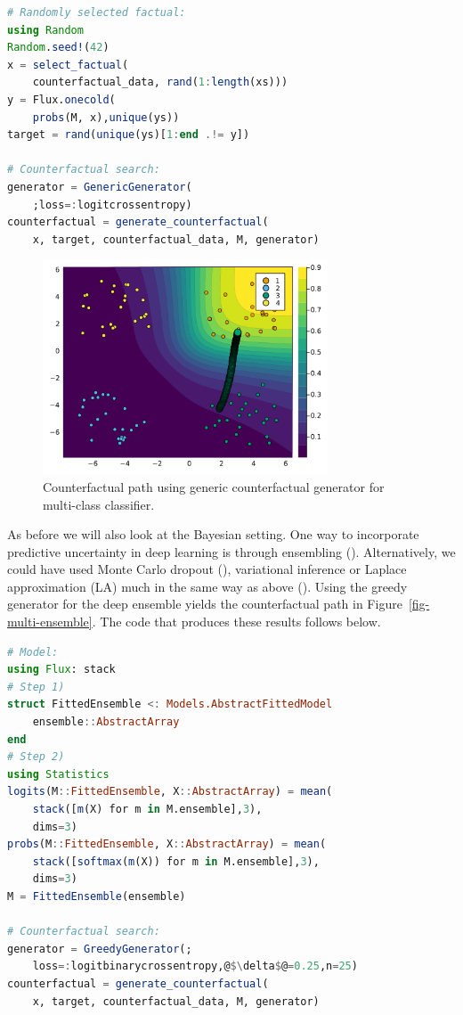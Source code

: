 \documentclass{juliacon}
\begin{document}
\begin{lstlisting}[language=Julia, escapechar=@]
# Randomly selected factual:
using Random
Random.seed!(42)
x = select_factual(
    counterfactual_data, rand(1:length(xs))) 
y = Flux.onecold(
    probs(M, x),unique(ys))
target = rand(unique(ys)[1:end .!= y]) 

# Counterfactual search:
generator = GenericGenerator(
    ;loss=:logitcrossentropy)
counterfactual = generate_counterfactual(
    x, target, counterfactual_data, M, generator)
\end{lstlisting}

\begin{figure}

{\centering \includegraphics[width=3.33333in,height=2.5in]{www/ce_multi.png}

}

\caption{\label{fig-multi}Counterfactual path using generic
counterfactual generator for multi-class classifier.}

\end{figure}

As before we will also look at the Bayesian setting. One way to
incorporate predictive uncertainty in deep learning is through
ensembling (\cite{lakshminarayanan2016simple}). Alternatively, we could
have used Monte Carlo dropout (\cite{gal2016dropout}), variational
inference or Laplace approximation (LA) much in the same way as above
(\cite{daxberger2021laplace}). Using the greedy generator for the deep
ensemble yields the counterfactual path in
Figure~\ref{fig-multi-ensemble}. The code that produces these results
follows below.

\begin{lstlisting}[language=Julia, escapechar=@]
# Model:
using Flux: stack
# Step 1)
struct FittedEnsemble <: Models.AbstractFittedModel
    ensemble::AbstractArray
end
# Step 2)
using Statistics
logits(M::FittedEnsemble, X::AbstractArray) = mean(
    stack([m(X) for m in M.ensemble],3), 
    dims=3)
probs(M::FittedEnsemble, X::AbstractArray) = mean(
    stack([softmax(m(X)) for m in M.ensemble],3),
    dims=3)
M = FittedEnsemble(ensemble)

# Counterfactual search:
generator = GreedyGenerator(;
    loss=:logitbinarycrossentropy,@$\delta$@=0.25,n=25)
counterfactual = generate_counterfactual(
    x, target, counterfactual_data, M, generator)
\end{lstlisting}
\end{document}
